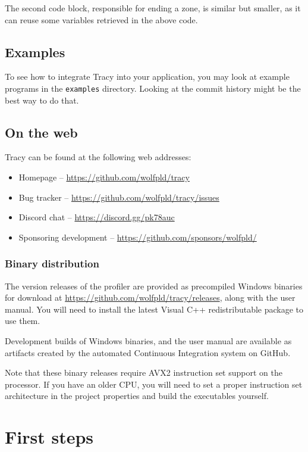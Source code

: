 \documentclass[hidelinks,titlepage,a4paper]{article}
\begin{document}
The second code block, responsible for ending a zone, is similar but smaller, as it can reuse some variables retrieved in the above code.

\subsection{Examples}

To see how to integrate Tracy into your application, you may look at example programs in the \texttt{examples} directory. Looking at the commit history might be the best way to do that.

\subsection{On the web}

Tracy can be found at the following web addresses:

\begin{itemize}
\item Homepage -- \url{https://github.com/wolfpld/tracy}
\item Bug tracker -- \url{https://github.com/wolfpld/tracy/issues}
\item Discord chat -- \url{https://discord.gg/pk78auc}
\item Sponsoring development -- \url{https://github.com/sponsors/wolfpld/}
\end{itemize}

\subsubsection{Binary distribution}

The version releases of the profiler are provided as precompiled Windows binaries for download at \url{https://github.com/wolfpld/tracy/releases}, along with the user manual. You will need to install the latest Visual C++ redistributable package to use them.

Development builds of Windows binaries, and the user manual are available as artifacts created by the automated Continuous Integration system on GitHub.

Note that these binary releases require AVX2 instruction set support on the processor. If you have an older CPU, you will need to set a proper instruction set architecture in the project properties and build the executables yourself.

\section{First steps}
\label{firststeps}
\end{document}
